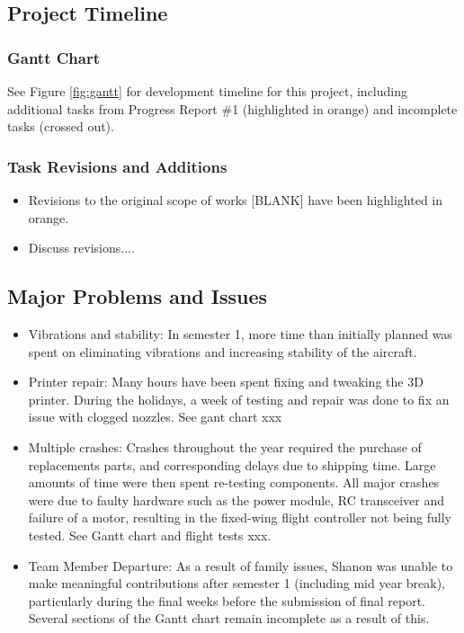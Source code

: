\subsection{Project Timeline}
\subsubsection*{Gantt Chart}
\label{sec:gantt}
See Figure \ref{fig:gantt} for development timeline for this project, including additional tasks from Progress Report \#1 (highlighted in orange) and incomplete tasks (crossed out). 

\subsubsection*{Task Revisions and Additions}

\begin{itemize}
	\item Revisions to the original scope of works [BLANK] have been highlighted in orange.
	
	\item Discuss revisions....
	
\end{itemize}

\subsection{Major Problems and Issues}
\begin{itemize}
	\item Vibrations and stability: In semester 1, more time than initially planned was spent on eliminating vibrations and increasing stability of the aircraft. 
	
	\item Printer repair: Many hours have been spent fixing and tweaking the 3D printer.  During the holidays, a week of testing and repair was done to fix an issue with clogged nozzles. See gant chart xxx
	
	\item Multiple crashes: Crashes throughout the year required the purchase of replacements parts, and corresponding delays due to shipping time. Large amounts of time were then spent re-testing components. All major crashes were due to faulty hardware such as the power module, RC transceiver and failure of a motor, resulting in the fixed-wing flight controller not being fully tested. See Gantt chart and flight tests xxx.
	
	\item Team Member Departure: As a result of family issues, Shanon was unable to make meaningful contributions after semester 1 (including mid year break), particularly during the final weeks before the submission of final report. Several sections of the Gantt chart remain incomplete as a result of this.
\end{itemize}

